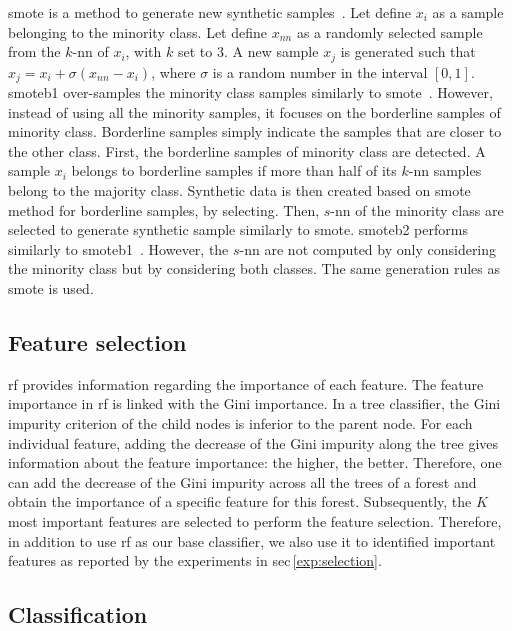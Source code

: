 \documentclass[final,3p,times,twocolumn]{elsarticle}
\begin{document}
\Ac{smote} is a method to generate new synthetic
samples~\cite{chawla2002smote}. Let define $x_i$ as a sample belonging to the
minority class. Let define $x_{nn}$ as a randomly selected sample from the
$k$-\ac{nn} of $x_i$, with $k$ set to 3. A new sample $x_j$ is generated such
that $x_j = x_i + \sigma \left( x_{nn} - x_i \right)$, where $\sigma$ is a
random number in the interval $\left[0,1\right]$. \Ac{smoteb1} over-samples the
minority class samples similarly to \ac{smote}~\cite{han2005borderline}.
However, instead of using all the minority samples, it focuses on the
borderline samples of minority class.  Borderline samples simply indicate the
samples that are closer to the other class. First, the borderline samples of
minority class are detected. A sample $x_{i}$ belongs to borderline samples if
more than half of its $k$-\ac{nn} samples belong to the majority
class. Synthetic data is then created based on \ac{smote} method for borderline
samples, by selecting. Then, $s$-\ac{nn} of the minority class are selected to
generate synthetic sample similarly to \ac{smote}. \Ac{smoteb2} performs
similarly to \ac{smoteb1}~\cite{han2005borderline}.  However, the $s$-\ac{nn}
are not computed by only considering the minority class but by considering both
classes. The same generation rules as \ac{smote} is used.

\subsection{Feature selection}\label{features:selection}

\Ac{rf} provides information regarding the importance of each feature. The
feature importance in \ac{rf} is linked with the Gini importance. In a tree
classifier, the Gini impurity criterion of the child nodes is inferior to the
parent node. For each individual feature, adding the decrease of the Gini
impurity along the tree gives information about the feature importance: the
higher, the better. Therefore, one can add the decrease of the Gini impurity
across all the trees of a forest and obtain the importance of a specific
feature for this forest. Subsequently, the $K$ most important features are
selected to perform the feature selection. Therefore, in addition to use
\ac{rf} as our base classifier, we also use it to identified important features
as reported by the experiments in \acs{sec}\,\ref{exp:selection}.

\subsection{Classification}
\end{document}

